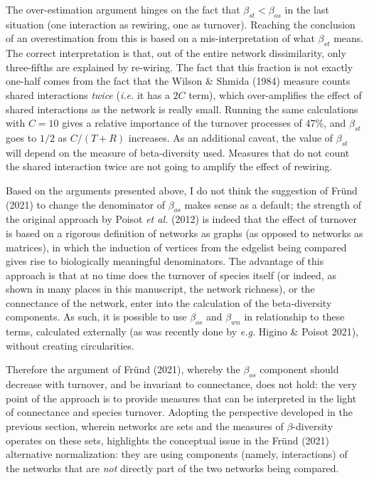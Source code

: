 \documentclass[10pt,oneside]{article}
\begin{document}
The over-estimation argument hinges on the fact that
\(\beta_{st} < \beta_{os}\) in the last situation (one interaction as
rewiring, one as turnover). Reaching the conclusion of an overestimation
from this is based on a mis-interpretation of what \(\beta_{st}\) means.
The correct interpretation is that, out of the entire network
dissimilarity, only three-fifths are explained by re-wiring. The fact
that this fraction is not exactly one-half comes from the fact that the
Wilson \& Shmida (1984) measure counts shared interactions \emph{twice}
(\emph{i.e.} it has a \(2C\) term), which over-amplifies the effect of
shared interactions as the network is really small. Running the same
calculations with \(C = 10\) gives a relative importance of the turnover
processes of 47\%, and \(\beta_{st}\) goes to \(1/2\) as \(C/(T+R)\)
increases. As an additional caveat, the value of \(\beta_{st}\) will
depend on the measure of beta-diversity used. Measures that do not count
the shared interaction twice are not going to amplify the effect of
rewiring.

Based on the arguments presented above, I do not think the suggestion of
Fründ (2021) to change the denominator of \(\beta_{os}\) makes sense as
a default; the strength of the original approach by Poisot \emph{et al.}
(2012) is indeed that the effect of turnover is based on a rigorous
definition of networks as graphs (as opposed to networks as matrices),
in which the induction of vertices from the edgelist being compared
gives rise to biologically meaningful denominators. The advantage of
this approach is that at no time does the turnover of species itself (or
indeed, as shown in many places in this manuscript, the network
richness), or the connectance of the network, enter into the calculation
of the beta-diversity components. As such, it is possible to use
\(\beta_{os}\) and \(\beta_{wn}\) in relationship to these terms,
calculated externally (as was recently done by \emph{e.g.} Higino \&
Poisot 2021), without creating circularities.

Therefore the argument of Fründ (2021), whereby the \(\beta_{os}\)
component should decrease with turnover, and be invariant to
connectance, does not hold: the very point of the approach is to provide
measures that can be interpreted in the light of connectance and species
turnover. Adopting the perspective developed in the previous section,
wherein networks are sets and the measures of \(\beta\)-diversity
operates on these sets, highlights the conceptual issue in the Fründ
(2021) alternative normalization: they are using components (namely,
interactions) of the networks that are \emph{not} directly part of the
two networks being compared.
\end{document}
